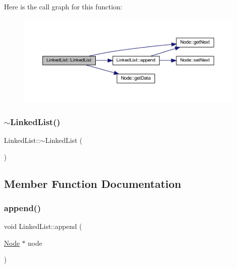 Here is the call graph for this function\+:
\nopagebreak
\begin{figure}[H]
\begin{center}
\leavevmode
\includegraphics[width=350pt]{class_linked_list_a5dd2a88ad50e83aee19dea51c8d87d90_cgraph}
\end{center}
\end{figure}
\mbox{\label{class_linked_list_a35811ed58ff0d8d9cc9b309b8d8f5111}} 
\subsubsection{\texorpdfstring{$\sim$\+Linked\+List()}{~LinkedList()}}
{\footnotesize\ttfamily Linked\+List\+::$\sim$\+Linked\+List (\begin{DoxyParamCaption}{ }\end{DoxyParamCaption})}



\subsection{Member Function Documentation}
\mbox{\label{class_linked_list_a2e67fa8d36b83febafbd5f3801ec43db}} 
\subsubsection{\texorpdfstring{append()}{append()}}
{\footnotesize\ttfamily void Linked\+List\+::append (\begin{DoxyParamCaption}\item[{\hyperlink{class_node}{Node} $\ast$}]{node }\end{DoxyParamCaption})}

